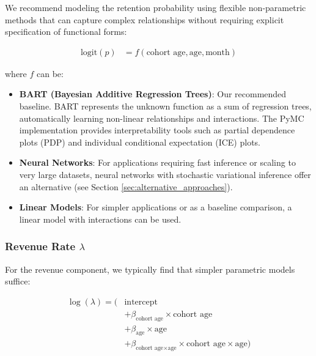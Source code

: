 \documentclass[11pt]{amsart}
\theoremstyle{definition}
\begin{document}
We recommend modeling the retention probability using flexible non-parametric methods that can capture complex 
relationships without requiring explicit specification of functional forms:

\begin{align*}
    \textrm{logit}(p) & = f(\text{cohort age}, \text{age}, \text{month})
\end{align*}

where $f$ can be:

\begin{itemize}
    \item \textbf{BART (Bayesian Additive Regression Trees)}: Our recommended baseline. BART \cite{chipman2010bart} 
          represents the unknown function as a sum of regression trees, automatically learning non-linear 
          relationships and interactions. The PyMC implementation \cite{quiroga2022bart} provides interpretability 
          tools such as partial dependence plots (PDP) and individual conditional expectation (ICE) plots.
    
    \item \textbf{Neural Networks}: For applications requiring fast inference or scaling to very large datasets, 
          neural networks with stochastic variational inference offer an alternative (see Section \ref{sec:alternative_approaches}).
    
    \item \textbf{Linear Models}: For simpler applications or as a baseline comparison, a linear model with 
          interactions can be used.
\end{itemize}

\subsubsection{Revenue Rate $\lambda$}

For the revenue component, we typically find that simpler parametric models suffice:

\begin{align*}
    \log(\lambda) = ( & \text{intercept}                                                                          \\
                      & + \beta_{\text{cohort age}} \times \text{cohort age}                                      \\
                      & + \beta_{\text{age}} \times \text{age}                                                    \\
                      & + \beta_{\text{cohort age} \times \text{age}} \times \text{cohort age} \times \text{age})
\end{align*}
\end{document}
